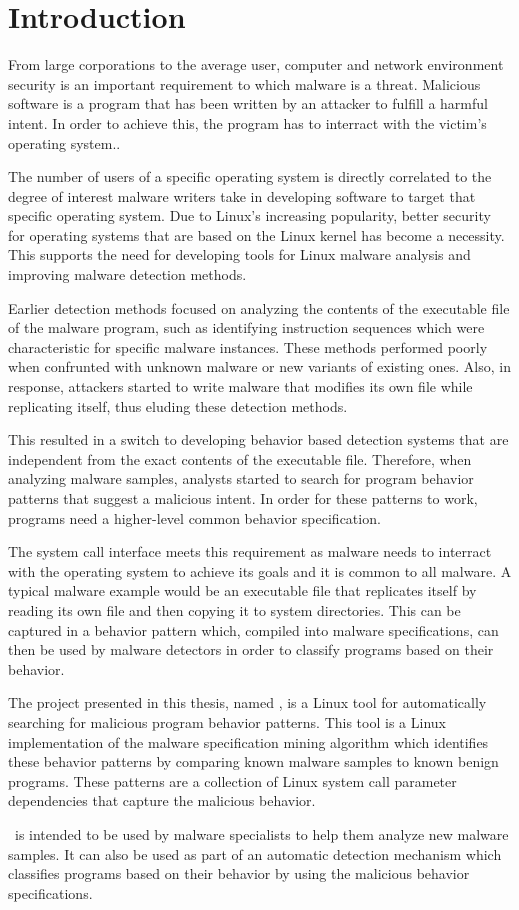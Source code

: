 \chapter{Introduction}
\label{chapter:intro}

From large corporations to the average user, computer and network environment security is an important requirement to which malware is a threat. Malicious software is a program that has been written by an attacker to fulfill a harmful intent. In order to achieve this, the program has to interract with the victim's operating system..

The number of users of a specific operating system is directly correlated to the degree of interest malware writers take in developing software to target that specific operating system. Due to Linux's increasing popularity, better security for operating systems that are based on the Linux kernel has become a necessity. This supports the need for developing tools for Linux malware analysis and improving malware detection methods.

Earlier detection methods focused on analyzing the contents of the executable file of the malware program, such as identifying instruction sequences which were characteristic for specific malware instances. These methods performed poorly when confrunted with unknown malware or new variants of existing ones. Also, in response, attackers started to write malware that modifies its own file while replicating itself, thus eluding these detection methods.

This resulted in a switch to developing behavior based detection systems that are independent from the exact contents of the executable file. Therefore, when analyzing malware samples, analysts started to search for program behavior patterns that suggest a malicious intent. In order for these patterns to work, programs need a higher-level common behavior specification.

The system call interface meets this requirement as malware needs to interract with the operating system to achieve its goals and it is common to all malware. A typical malware example would be an executable file that replicates itself by reading its own file and then copying it to system directories. This can be captured in a behavior pattern which, compiled into malware specifications, can then be used by malware detectors in order to classify programs based on their behavior.

The project presented in this thesis, named \project, is a Linux tool for automatically searching for malicious program behavior patterns. This tool is a Linux implementation of the malware specification mining algorithm which identifies these behavior patterns by comparing known malware samples to known benign programs. These patterns are a collection of Linux system call parameter dependencies that capture the malicious behavior.

\project\ is intended to be used by malware specialists to help them analyze new malware samples. It can also be used as part of an automatic detection mechanism which classifies programs based on their behavior by using the malicious behavior specifications.
